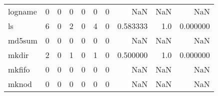 \begin{tabular}{lrrrrrrrrr}
logname   &                                       0 &                                                  0 &                                                  0 &                                                  0 &                                                  0 &                                                  0 &                                                NaN &                                    NaN &                                  NaN \\
ls        &                                       6 &                                                  0 &                                                  2 &                                                  0 &                                                  4 &                                                  0 &                                           0.583333 &                                    1.0 &                             0.000000 \\
md5sum    &                                       0 &                                                  0 &                                                  0 &                                                  0 &                                                  0 &                                                  0 &                                                NaN &                                    NaN &                                  NaN \\
mkdir     &                                       2 &                                                  0 &                                                  1 &                                                  0 &                                                  1 &                                                  0 &                                           0.500000 &                                    1.0 &                             0.000000 \\
mkfifo    &                                       0 &                                                  0 &                                                  0 &                                                  0 &                                                  0 &                                                  0 &                                                NaN &                                    NaN &                                  NaN \\
mknod     &                                       0 &                                                  0 &                                                  0 &                                                  0 &                                                  0 &                                                  0 &                                                NaN &                                    NaN &                                  NaN \\

\end{tabular}
